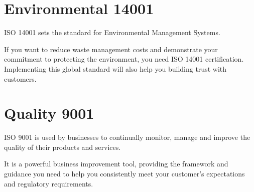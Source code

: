 \documentclass[a4paper,12pt]{article}
\begin{document}
\section{Environmental 14001}
ISO 14001 sets the standard for Environmental Management Systems.

If you want to reduce waste management costs and demonstrate your commitment to protecting the environment, you need ISO 14001 certification. Implementing this global standard will also help you building trust with customers.

\section{Quality 9001}
ISO 9001 is used by businesses to continually monitor, manage and improve the quality of their products and services.

It is a powerful business improvement tool, providing the framework and guidance you need to help you consistently meet your customer’s expectations and regulatory requirements.

\clearpage

\printindex
\end{document}
